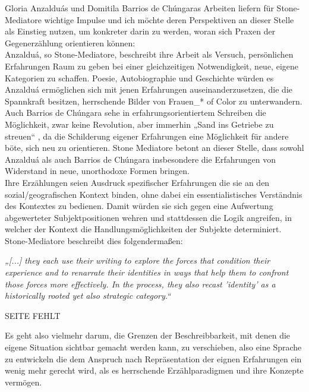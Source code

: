 Gloria Anzalduás und Domitila Barrios de Chúngaras Arbeiten liefern für
Stone-Mediatore wichtige Impulse und ich möchte deren Perspektiven an dieser
Stelle als Einstieg nutzen, um konkreter darin zu werden, woran sich Praxen der
Gegenerzählung orientieren können: 
\\
Anzalduá, so Stone-Mediatore, beschreibt
ihre Arbeit als Versuch, persönlichen Erfahrungen Raum zu geben bei einer
gleichzeitigen Notwendigkeit, neue, eigene Kategorien zu schaffen. Poesie,
Autobiographie und Geschichte würden es Anzalduá ermöglichen sich mit jenen
Erfahrungen auseinanderzusetzen, die die Spannkraft besitzen, herrschende
Bilder von Frauen\_* of Color zu unterwandern.\footnotemark {} \\
Auch Barrios de Chúngara sehe in
erfahrungsorientiertem Schreiben die Möglichkeit, zwar keine Revolution, aber
immerhin „Sand ins Getriebe zu streuen“ \footnotemark {}, da die Schilderung eigener
Erfahrungen eine Möglichkeit für andere böte, sich neu zu orientieren. Stone
Mediatore betont an dieser Stelle, dass sowohl Anzalduá als auch Barrios de
Chúngara insbesondere die Erfahrungen von Widerstand in neue, unorthodoxe
Formen bringen. \\
Ihre Erzählungen seien Ausdruck spezifischer Erfahrungen die
sie an den sozial/geografischen Kontext binden, ohne dabei ein
essentialistisches Verständnis des Kontextes zu bedienen. Damit würden sie sich
gegen eine Aufwertung abgewerteter Subjektpositionen wehren und stattdessen die
Logik angreifen, in welcher der Kontext die Handlungsmöglichkeiten der Subjekte
determiniert.\footnotemark {} Stone-Mediatore beschreibt dies folgendermaßen:
\begin{myenv}
    \textit{„[...] they each use their writing to explore the forces that
    condition their experience and to renarrate their identities in ways that
  help them to confront those forces more effectively. In the process, they
also recast 'identity' as a historically rooted yet also strategic
category.“\footnotemark {}}
\end{myenv}


SEITE FEHLT


Es geht also vielmehr darum, die Grenzen der Beschreibbarkeit, mit denen die
eigene Situation sichtbar gemacht werden kann, zu verschieben, also eine
Sprache zu entwickeln die dem Anspruch nach Repräsentation der eignen
Erfahrungen ein wenig mehr gerecht wird, als es herrschende Erzählparadigmen
und ihre Konzepte vermögen.
